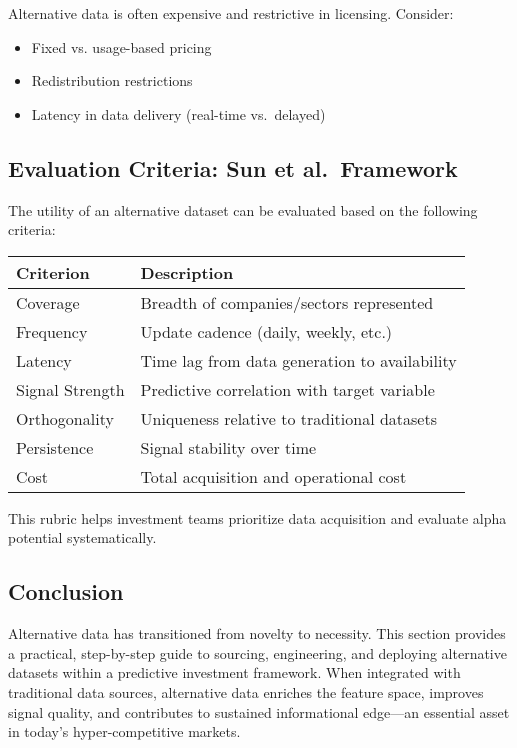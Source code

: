 Alternative data is often expensive and restrictive in licensing. Consider:

\begin{itemize}
    \item Fixed vs. usage-based pricing
    \item Redistribution restrictions
    \item Latency in data delivery (real-time vs.\ delayed)
\end{itemize}

\subsection{Evaluation Criteria: Sun et al.\ Framework}

The utility of an alternative dataset can be evaluated based on the following criteria:

\begin{center}
\begin{tabular}{|l|p{9cm}|}
\hline
\textbf{Criterion} & \textbf{Description} \\
\hline
Coverage & Breadth of companies/sectors represented \\
Frequency & Update cadence (daily, weekly, etc.) \\
Latency & Time lag from data generation to availability \\
Signal Strength & Predictive correlation with target variable \\
Orthogonality & Uniqueness relative to traditional datasets \\
Persistence & Signal stability over time \\
Cost & Total acquisition and operational cost \\
\hline
\end{tabular}
\end{center}

This rubric helps investment teams prioritize data acquisition and evaluate alpha potential systematically.

\subsection{Conclusion}

Alternative data has transitioned from novelty to necessity. This section provides a practical, step-by-step guide to sourcing, engineering, and deploying alternative datasets within a predictive investment framework. When integrated with traditional data sources, alternative data enriches the feature space, improves signal quality, and contributes to sustained informational edge—an essential asset in today’s hyper-competitive markets.

